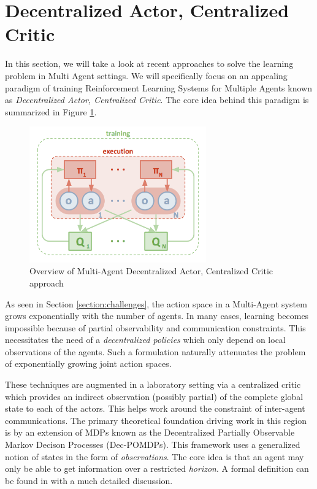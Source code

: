 \documentclass[12pt,a4paper]{article}
\begin{document}
\section{Decentralized Actor, Centralized Critic} \label{section:approaches}

In this section, we will take a look at recent approaches to solve the learning  problem in Multi
Agent settings. We will specifically focus on an appealing paradigm of training Reinforcement
Learning Systems for Multiple Agents known as \textit{Decentralized Actor, Centralized Critic}.
The core idea behind this paradigm is summarized in Figure \ref{fig:dacc}.

\begin{figure}[ht]
\centering
\includegraphics[width=3in]{ma-ac-dec}
\caption{Overview of Multi-Agent Decentralized Actor, Centralized Critic approach \cite{2017arXiv170602275L}} \label{fig:dacc}
\end{figure}

As seen in Section \ref{section:challenges}, the action space in a Multi-Agent system grows
exponentially with the number of agents. In many cases, learning becomes impossible because
of partial observability and communication constraints. This necessitates the need of a
\textit{decentralized policies} which only depend on local observations of the agents. Such a
formulation naturally attenuates the problem of exponentially growing joint action spaces.

These techniques are augmented in a laboratory setting via a centralized critic which provides
an indirect observation (possibly partial) of the complete global state to each of the actors. This 
helps work around the constraint of inter-agent communications. The primary theoretical
foundation driving work in this region is by an extension of MDPs known as the Decentralized 
Partially Observable Markov Decison Processes (Dec-POMDPs). This framework uses a
generalized notion of states in the form of \textit{observations}. The core idea is that an agent
may only be able to get information over a restricted \textit{horizon}. A formal definition can
be found in \cite{Oliehoek:2016:CID:2967142} with a much detailed discussion.
\end{document}
